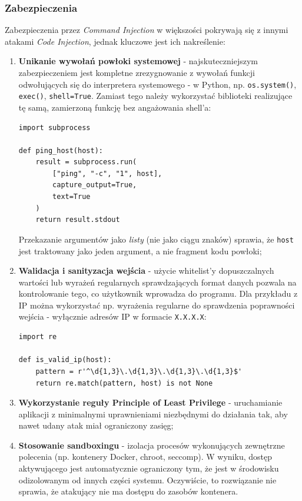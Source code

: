 \documentclass[12pt,a4paper]{article}
\begin{document}
\subsubsection{Zabezpieczenia}

Zabezpieczenia przez \emph{Command Injection} w większości pokrywają się z innymi atakami \emph{Code Injection}, jednak kluczowe jest ich nakreślenie:
\begin{enumerate}
    \item \textbf{Unikanie wywołań powłoki systemowej} - najskuteczniejszym zabezpieczeniem jest kompletne zrezygnowanie z wywołań funkcji odwołujących się do 
            interpretera systemowego - w Python, np. \texttt{os.system()}, \texttt{exec()}, \texttt{shell=True}. Zamiast tego należy wykorzystać biblioteki realizujące
            tę samą, zamierzoną funkcję bez angażowania shell'a:
\begin{tcolorbox}
\begin{verbatim}
import subprocess

def ping_host(host):
    result = subprocess.run(
        ["ping", "-c", "1", host],
        capture_output=True,
        text=True
    )
    return result.stdout
\end{verbatim}
\end{tcolorbox}
          Przekazanie argumentów jako \emph{listy} (nie jako ciągu znaków) sprawia, że \texttt{host}
          jest traktowany jako jeden argument, a nie fragment kodu powłoki;

    \item \textbf{Walidacja i sanityzacja wejścia} - użycie whitelist'y dopuszczalnych wartości lub wyrażeń regularnych sprawdzających format danych 
            pozwala na kontrolowanie tego, co użytkownik wprowadza do programu. Dla przykładu z IP można wykorzystać np. wyrażenia regularne do sprawdzenia 
            poprawności wejścia - wyłącznie adresów IP w formacie \texttt{X.X.X.X}:
\begin{tcolorbox}
\begin{verbatim}
import re

def is_valid_ip(host):
    pattern = r'^\d{1,3}\.\d{1,3}\.\d{1,3}\.\d{1,3}$'
    return re.match(pattern, host) is not None
\end{verbatim}
\end{tcolorbox}

    \item \textbf{Wykorzystanie reguły Principle of Least Privilege} - uruchamianie aplikacji z minimalnymi uprawnieniami niezbędnymi do działania 
            tak, aby nawet udany atak miał ograniczony zasięg;

    \item \textbf{Stosowanie sandboxingu} - izolacja procesów wykonujących zewnętrzne polecenia (np. kontenery Docker, chroot, seccomp). W wyniku, dostęp aktywującego 
            jest automatycznie ograniczony tym, że jest w środowisku odizolowanym od innych części systemu. Oczywiście, to rozwiązanie nie sprawia, że atakujący nie ma dostępu do zasobów kontenera.
\end{enumerate}
\end{document}
